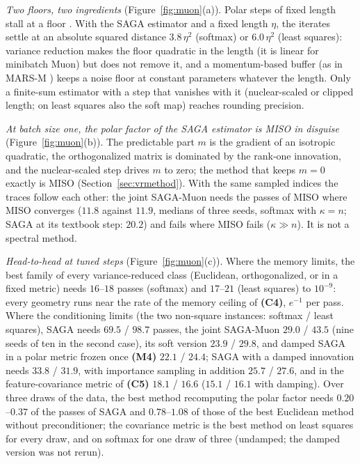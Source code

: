 \documentclass[10pt]{article}
\newcommand{\finding}[1]{\textbf{(#1)}}
\begin{document}
\begin{description}[leftmargin=2.3em,labelwidth=2.0em,labelsep=0.3em,itemsep=1pt,topsep=3pt,parsep=0pt,font=\normalfont\bfseries]
\item[(M1)] \emph{Two floors, two ingredients} (Figure~\ref{fig:muon}(a)). Polar steps of fixed length stall at a
floor \cite{lau2025polargrad}. With the SAGA estimator and a fixed length $\eta$, the iterates settle at an
absolute squared distance $3.8\,\eta^2$ (softmax) or $6.0\,\eta^2$ (least squares): variance reduction makes the floor
quadratic in the length (it is linear for minibatch Muon) but does not remove it, and a momentum-based buffer (as in
MARS-M \cite{liu2025marsm}) keeps a noise floor at constant parameters whatever the length. Only a finite-sum
estimator with a step that vanishes with it (nuclear-scaled or clipped length; on least squares also the soft map)
reaches rounding precision.

\item[(M2)] \emph{At batch size one, the polar factor of the SAGA estimator is MISO in disguise}
(Figure~\ref{fig:muon}(b)). The predictable part $m$ is the gradient of an isotropic quadratic, the orthogonalized
matrix is dominated by the rank-one innovation, and the nuclear-scaled step drives $m$ to zero; the method that keeps
$m=0$ exactly is MISO (Section~\ref{sec:vrmethod}). With the same sampled indices the
traces follow each other: the joint SAGA-Muon needs the passes of MISO where MISO converges ($11.8$ against $11.9$,
medians of three seeds, softmax with $\kappa=n$; SAGA at its textbook step: $20.2$) and fails where MISO fails
($\kappa\gg n$). It is not a spectral method.

\item[(M3)] \emph{Head-to-head at tuned steps} (Figure~\ref{fig:muon}(c)). Where the memory limits, the best family
of every variance-reduced class (Euclidean, orthogonalized, or in a fixed metric) needs $16$--$18$ passes (softmax) and
$17$--$21$ (least squares) to $10^{-9}$: every geometry runs near the rate of the memory ceiling of \finding{C4},
$e^{-1}$ per pass. Where the conditioning limits (the two non-square instances: softmax / least squares), SAGA
needs $69.5$ / $98.7$ passes, the joint
SAGA-Muon $29.0$ / $43.5$ (nine seeds of ten in the second case), its soft version $23.9$ / $29.8$, and damped SAGA in
a polar metric frozen once \finding{M4} $22.1$ / $24.4$; SAGA with a damped innovation \cite{driggs2019biased} needs
$33.8$ / $31.9$, with importance sampling \cite{xiao2014proximal} in addition $25.7$ / $27.6$, and in the
feature-covariance metric of \finding{C5} \cite{yang2014data} $18.1$ / $16.6$ ($15.1$ / $16.1$ with damping). Over
three draws of the data, the best method recomputing the polar factor needs $0.20$--$0.37$ of the passes of SAGA and
$0.78$--$1.08$ of those of the best Euclidean method without preconditioner; the covariance metric is the best method
on least squares for every draw, and on softmax for one draw of three (undamped; the damped version was not rerun).


\end{description}
\end{document}
